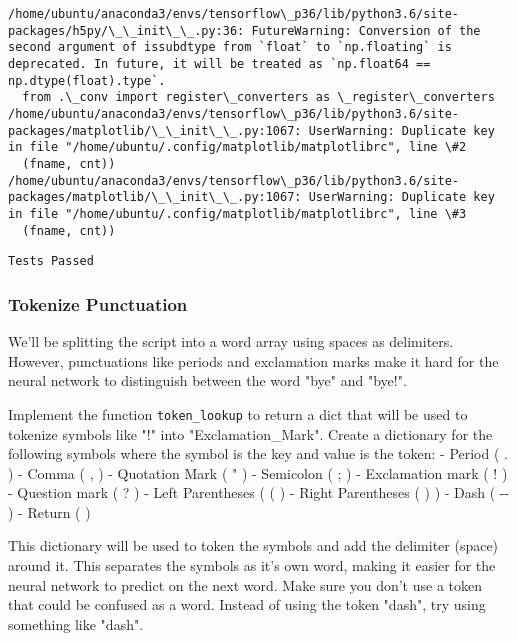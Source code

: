 \documentclass[11pt]{article}
\begin{document}
    \begin{Verbatim}[commandchars=\\\{\}]
/home/ubuntu/anaconda3/envs/tensorflow\_p36/lib/python3.6/site-packages/h5py/\_\_init\_\_.py:36: FutureWarning: Conversion of the second argument of issubdtype from `float` to `np.floating` is deprecated. In future, it will be treated as `np.float64 == np.dtype(float).type`.
  from .\_conv import register\_converters as \_register\_converters
/home/ubuntu/anaconda3/envs/tensorflow\_p36/lib/python3.6/site-packages/matplotlib/\_\_init\_\_.py:1067: UserWarning: Duplicate key in file "/home/ubuntu/.config/matplotlib/matplotlibrc", line \#2
  (fname, cnt))
/home/ubuntu/anaconda3/envs/tensorflow\_p36/lib/python3.6/site-packages/matplotlib/\_\_init\_\_.py:1067: UserWarning: Duplicate key in file "/home/ubuntu/.config/matplotlib/matplotlibrc", line \#3
  (fname, cnt))

    \end{Verbatim}

    \begin{Verbatim}[commandchars=\\\{\}]
Tests Passed

    \end{Verbatim}

    \subsubsection{Tokenize Punctuation}\label{tokenize-punctuation}

We'll be splitting the script into a word array using spaces as
delimiters. However, punctuations like periods and exclamation marks
make it hard for the neural network to distinguish between the word
"bye" and "bye!".

Implement the function \texttt{token\_lookup} to return a dict that will
be used to tokenize symbols like "!" into
"\textbar{}\textbar{}Exclamation\_Mark\textbar{}\textbar{}". Create a
dictionary for the following symbols where the symbol is the key and
value is the token: - Period ( . ) - Comma ( , ) - Quotation Mark ( " )
- Semicolon ( ; ) - Exclamation mark ( ! ) - Question mark ( ? ) - Left
Parentheses ( ( ) - Right Parentheses ( ) ) - Dash ( -\/- ) - Return (
\n )

This dictionary will be used to token the symbols and add the delimiter
(space) around it. This separates the symbols as it's own word, making
it easier for the neural network to predict on the next word. Make sure
you don't use a token that could be confused as a word. Instead of using
the token "dash", try using something like
"\textbar{}\textbar{}dash\textbar{}\textbar{}".
\end{document}
